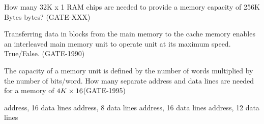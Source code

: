 


\begin{questyle}

  \question  How many 32K x 1 RAM chips are needed to provide a memory capacity of 256K Bytes bytes? (GATE-XXX)

  \begin{oneparchoices}
  \end{oneparchoices}

\end{questyle}



\begin{questyle}

  \question  Transferring data in blocks from the main memory to the cache memory enables an interleaved main memory unit to operate unit at its maximum speed. True/False. (GATE-1990)

\end{questyle}


\begin{questyle}

  \question  The capacity of a memory unit is defined by the number of words multiplied by the number of bits/word. How many separate address and data lines are needed for a memory of \( \large 4K \times 16 \)(GATE-1995)

  \begin{choices}
     address, 16 data lines
     address, 8 data lines
     address, 16 data lines
     address, 12 data lines
  \end{choices}

\end{questyle}


\begin{comment}

\begin{questyle}

  \question  (GATE-XXX)

  \begin{choices}
    \choice XXX
    \choice XXX
    \choice XXX
    \choice XXX
  \end{choices}

\end{questyle}


\end{comment}

